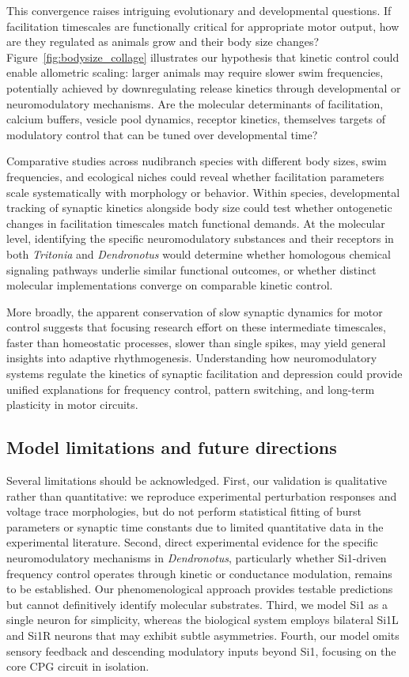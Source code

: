 \documentclass[nofootinbib,aip,amsmath,amssymb,preprint,twocolumn,floatfix,10pt]{revtex4-2}
\begin{document}
This convergence raises intriguing evolutionary and developmental questions. If facilitation timescales are functionally critical for appropriate motor output, how are they regulated as animals grow and their body size changes? Figure~\ref{fig:bodysize_collage} illustrates our hypothesis that kinetic control could enable allometric scaling: larger animals may require slower swim frequencies, potentially achieved by downregulating release kinetics through developmental or neuromodulatory mechanisms. Are the molecular determinants of facilitation, calcium buffers, vesicle pool dynamics, receptor kinetics, themselves targets of modulatory control that can be tuned over developmental time?

Comparative studies across nudibranch species with different body sizes, swim frequencies, and ecological niches could reveal whether facilitation parameters scale systematically with morphology or behavior. Within species, developmental tracking of synaptic kinetics alongside body size could test whether ontogenetic changes in facilitation timescales match functional demands. At the molecular level, identifying the specific neuromodulatory substances and their receptors in both \textit{Tritonia} and \textit{Dendronotus} would determine whether homologous chemical signaling pathways underlie similar functional outcomes, or whether distinct molecular implementations converge on comparable kinetic control.

More broadly, the apparent conservation of slow synaptic dynamics for motor control suggests that focusing research effort on these intermediate timescales, faster than homeostatic processes, slower than single spikes, may yield general insights into adaptive rhythmogenesis. Understanding how neuromodulatory systems regulate the kinetics of synaptic facilitation and depression could provide unified explanations for frequency control, pattern switching, and long-term plasticity in motor circuits.

\subsection{Model limitations and future directions}

Several limitations should be acknowledged. First, our validation is qualitative rather than quantitative: we reproduce experimental perturbation responses and voltage trace morphologies, but do not perform statistical fitting of burst parameters or synaptic time constants due to limited quantitative data in the experimental literature. Second, direct experimental evidence for the specific neuromodulatory mechanisms in \textit{Dendronotus}, particularly whether Si1-driven frequency control operates through kinetic or conductance modulation, remains to be established. Our phenomenological approach provides testable predictions but cannot definitively identify molecular substrates. Third, we model Si1 as a single neuron for simplicity, whereas the biological system employs bilateral Si1L and Si1R neurons that may exhibit subtle asymmetries. Fourth, our model omits sensory feedback and descending modulatory inputs beyond Si1, focusing on the core CPG circuit in isolation.
\end{document}
